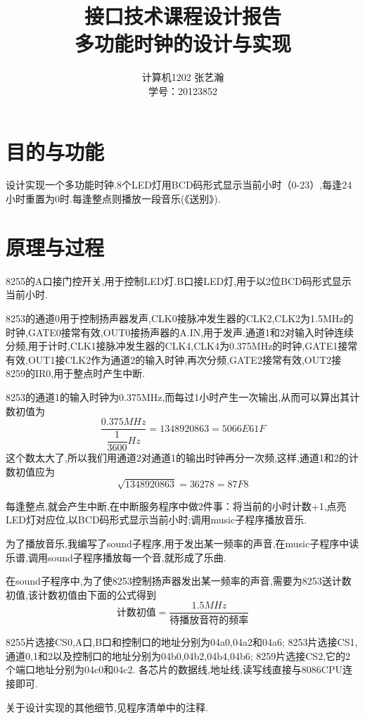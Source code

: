 \documentclass[11pt]{article}
\begin{document}
\title{接口技术课程设计报告\\多功能时钟的设计与实现}

\author{计算机1202 张艺瀚\\学号：20123852}
\maketitle

\section{目的与功能}
设计实现一个多功能时钟.8个LED灯用BCD码形式显示当前小时（0-23）,每逢24小时重置为0时.每逢整点则播放一段音乐(《送别》).

\section{原理与过程}
8255的A口接门控开关,用于控制LED灯.B口接LED灯,用于以2位BCD码形式显示当前小时.

8253的通道0用于控制扬声器发声,CLK0接脉冲发生器的CLK2,CLK2为1.5MHz的时钟,GATE0接常有效,OUT0接扬声器的A.IN,用于发声.通道1和2对输入时钟连续分频,用于计时,CLK1接脉冲发生器的CLK4,CLK4为0.375MHz的时钟,GATE1接常有效,OUT1接CLK2作为通道2的输入时钟,再次分频,GATE2接常有效,OUT2接8259的IR0,用于整点时产生中断.

8253的通道1的输入时钟为0.375MHz,而每过1小时产生一次输出,从而可以算出其计数初值为
\[ \frac{0.375MHz}{\dfrac{1}{3600}Hz} = 1348920863 = 5066E61F \]
这个数太大了,所以我们用通道2对通道1的输出时钟再分一次频,这样,通道1和2的计数初值应为
\[ \sqrt{1348920863} = 36278 = 87F8 \]

每逢整点,就会产生中断,在中断服务程序中做2件事：将当前的小时计数+1,点亮LED灯对应位,以BCD码形式显示当前小时;调用music子程序播放音乐.


为了播放音乐,我编写了sound子程序,用于发出某一频率的声音,在music子程序中读乐谱,调用sound子程序播放每一个音,就形成了乐曲.

在sound子程序中,为了使8253控制扬声器发出某一频率的声音,需要为8253送计数初值,该计数初值由下面的公式得到
\[ \text{计数初值}=\frac{1.5MHz}{\text{待播放音符的频率}} \]

8255片选接CS0,A口,B口和控制口的地址分别为04a0,04a2和04a6;
8253片选接CS1,通道0,1和2以及控制口的地址分别为04b0,04b2,04b4,04b6;
8259片选接CS2,它的2个端口地址分别为04c0和04c2.
各芯片的数据线,地址线,读写线直接与8086CPU连接即可.

关于设计实现的其他细节,见程序清单中的注释.
\end{document}
